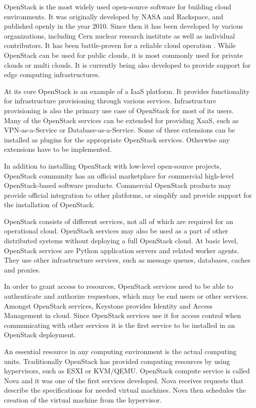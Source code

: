 \documentclass[officiallayout]{tktla}
\begin{document}
OpenStack \cite{openstack} is the most widely used open-source software for
building cloud environments. It was originally developed by NASA and Rackspace,
and published openly in the year 2010. Since then it has been developed by
various organizations, including Cern nuclear research institute as well as
individual contributors. It has been battle-proven for a reliable cloud
operation \cite{forrester}. While OpenStack can be used for public clouds, it
is most commonly used for private clouds or multi clouds. It is currently being
also developed to provide support for edge computing infrastructures.

At its core OpenStack is an example of a IaaS platform. It provides
functionality for infrastructure provisioning through various services.
Infrastructure provisioning is also the primary use case of OpenStack for most
of its users. Many of the OpenStack services can be extended for providing
XaaS, such as VPN-as-a-Service or Database-as-a-Service. Some of these
extensions can be installed as plugins for the appropriate OpenStack services.
Otherwise any extensions have to be implemented.

In addition to installing OpenStack with low-level open-source projects,
OpenStack community has an official marketplace for commercial high-level
OpenStack-based software products. Commercial OpenStack products may provide
official integration to other platforms, or simplify and provide support for
the installation of OpenStack.

OpenStack consists of different services, not all of which are required for an
operational cloud. OpenStack services may also be used as a part of other
distributed systems without deploying a full OpenStack cloud. At basic level,
OpenStack services are Python application servers and related worker agents.
They use other infrastructure services, such as message queues, databases,
caches and proxies.

In order to grant access to resources, OpenStack services need to be able to
authenticate and authorize requestors, which may be end users or other
services. Amongst OpenStack services, Keystone provides Identity and Access
Management in cloud. Since OpenStack services use it for access control when
communicating with other services it is the first service to be installed in
an OpenStack deployment.

An essential resource in any computing environment is the actual computing
units. Traditionally OpenStack has provided computing resources by using
hypervisors, such as ESXI or KVM/QEMU. OpenStack compute service is called
Nova and it was one of the first services developed. Nova receives requests
that describe the specifications for needed virtual machines. Nova then
schedules the creation of the virtual machine from the hypervisor.
\end{document}
